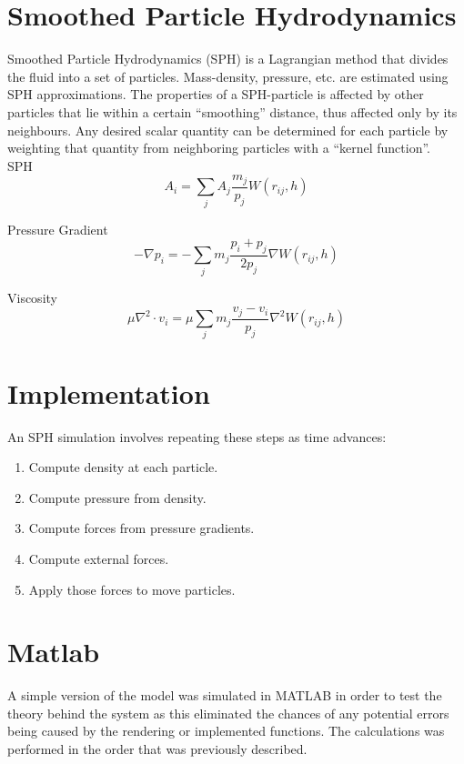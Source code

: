 \documentclass[a4paper,12pt,twoside]{report}
\begin{document}
\section{Smoothed Particle Hydrodynamics}
Smoothed Particle Hydrodynamics (SPH) is a Lagrangian method that divides the fluid into a set of particles. Mass-density, pressure, etc. are estimated using SPH approximations. The properties of a SPH-particle is affected by other particles that lie within a certain “smoothing” distance, thus affected only by its neighbours. Any desired scalar quantity can be determined for each particle by weighting that quantity from neighboring particles with a “kernel function”. \\

SPH
\begin{equation}
{A_i} = {\sum_j A_j} \frac{m_j}{p_j} {W(r_{ij},h)}
\end{equation}

Pressure Gradient
\begin{equation}
{-\nabla p_i} =  {-\sum_j}{m_j}\frac{p_i + p_j}{2p_j}{\nabla W(r_{ij},h)}
\end{equation}

Viscosity
\begin{equation}
{\mu \nabla^2 \cdot v_i} = {\mu}{\sum_j}{m_j}\frac{v_j - v_i}{p_j}{\nabla^2 W(r_{ij},h)}
\end{equation}


\section{Implementation}
An SPH simulation involves repeating these steps as time advances:
\begin{enumerate}
\item Compute density at each particle.
\item Compute pressure from density.
\item Compute forces from pressure gradients.
\item Compute external forces.
\item Apply those forces to move particles.
\end{enumerate}

\section{Matlab}
A simple version of the model was simulated in MATLAB in order to test the theory behind the system as this eliminated the chances of any potential errors being caused by the rendering or implemented functions. The calculations was performed in the order that was previously described.
\end{document}
